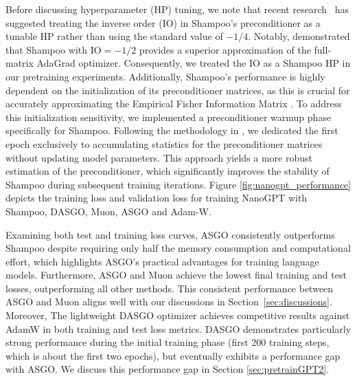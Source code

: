 \documentclass{article}
\theoremstyle{remark}
\begin{document}
Before discussing hyperparameter (HP) tuning, we note that recent research~\citep{shi2023distributed, morwani2024new, lin2024removesquarerootadaptivegradient} has suggested treating the inverse order (IO) in Shampoo's preconditioner as a tunable HP rather than using the standard value of $-1/4$. Notably, \citet{morwani2024new} demonstrated that Shampoo with IO$=-1/2$ provides a superior approximation of the full-matrix AdaGrad optimizer. Consequently, we treated the IO as a Shampoo HP in our pretraining experiments. Additionally, Shampoo's performance is highly dependent on the initialization of its preconditioner matrices, as this is crucial for accurately approximating the Empirical Fisher Information Matrix \citep{morwani2024new}. To address this initialization sensitivity, we implemented a preconditioner warmup phase specifically for Shampoo. Following the methodology in \citet{ren2021tensornormaltrainingdeep}, we dedicated the first epoch exclusively to accumulating statistics for the preconditioner matrices without updating model parameters. This approach yields a more robust estimation of the preconditioner, which significantly improves the stability of Shampoo during subsequent training iterations. Figure \ref{fig:nanogpt_performance} depicts the training loss and validation loss for training NanoGPT with Shampoo, DASGO, Muon, ASGO and Adam-W.

Examining both test and training loss curves, ASGO consistently outperforms Shampoo despite requiring only half the memory consumption and computational effort, which highlights ASGO's practical advantages for training language models. Furthermore, ASGO and Muon achieve the lowest final training and test losses, outperforming all other methods. This consistent performance between ASGO and Muon aligns well with our discussions in Section~\ref{sec:discussions}. Moreover, The lightweight DASGO optimizer achieves competitive results against AdamW in both training and test loss metrics. DASGO demonstrates particularly strong performance during the initial training phase (first 200 training steps, which is about the first two epochs), but eventually exhibits a performance gap with ASGO. We discuss this performance gap in Section \ref{sec:pretrainGPT2}.
\end{document}
